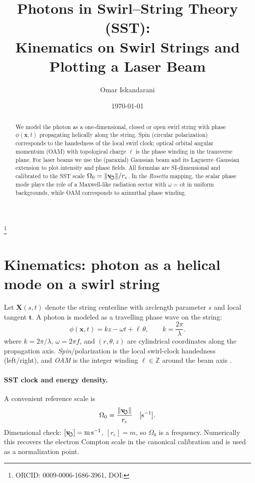 \documentclass[aps,prb,preprint,amsmath,amssymb]{revtex4-2} %
\newcommand{\vswirl}{\mathbf{v}_{\!\mkern-2mu\scriptstyle\boldsymbol{\circlearrowleft}}}
\newcommand{\rc}{r_c}
\begin{document}
    \title{\textbf{Photons in Swirl--String Theory (SST):\\
    Kinematics on Swirl Strings and Plotting a Laser Beam}}
    \author{Omar Iskandarani}
    \thanks{ORCID: 0009-0006-1686-3961, DOI: \paperdoi}
    \date{\today}




    \begin{abstract}
        We model the photon as a one-dimensional, closed or open swirl string with phase
        $\phi(\mathbf{x},t)$ propagating helically along the string. Spin (circular polarization)
        corresponds to the handedness of the local swirl clock; optical orbital angular momentum (OAM)
        with topological charge $\ell$ is the phase winding in the transverse plane. For laser beams we use
        the (paraxial) Gaussian beam and its Laguerre--Gaussian extension to plot intensity and phase fields.
        All formulas are SI-dimensional and calibrated to the SST scale
        $\Omega_0=\lVert\vswirl\rVert/\rc$.
        In the \emph{Rosetta} mapping, the scalar phase mode plays the role of a Maxwell-like radiation
        sector with $\omega=\! ck$ in uniform backgrounds, while OAM corresponds to azimuthal phase winding.
    \end{abstract}
    
    \maketitle
    
    
    \section{Kinematics: photon as a helical mode on a swirl string}
        Let $\mathbf{X}(s,t)$ denote the string centerline with arclength parameter $s$ and local tangent $\mathbf{t}$.
        A photon is modeled as a travelling phase wave on the string:
        \[
            \phi(\mathbf{x},t)=k z - \omega t + \ell\,\theta,\qquad k=\frac{2\pi}{\lambda}.
        \]
        where $k=2\pi/\lambda$, $\omega=2\pi f$, and $(r,\theta,z)$ are cylindrical coordinates along the propagation axis.
        \emph{Spin}/polarization is the local swirl-clock handedness (left/right), and \emph{OAM}
        is the integer winding $\ell\in\mathbb{Z}$ around the beam axis \cite{Allen1992,Siegman1986}.

        \paragraph{SST clock and energy density.}
            A convenient reference scale is
            \[
                \Omega_0=\frac{\lVert\vswirl\rVert}{\rc}\quad [\si{ s^{-1} }].
            \]
            Dimensional check: $[\vswirl]=\si{m\,s^{-1}}$, $[\rc]=\si{m}$, so $\Omega_0$ is a frequency.
            Numerically this recovers the electron Compton scale in the canonical calibration and is used as a
            normalization point.
\end{document}

